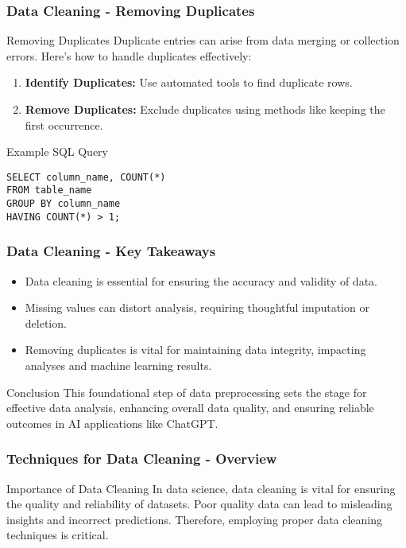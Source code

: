 \documentclass[aspectratio=169]{beamer}
\begin{document}
\begin{frame}[fragile]
    \frametitle{Data Cleaning - Removing Duplicates}
    \begin{block}{Removing Duplicates}
        Duplicate entries can arise from data merging or collection errors. Here’s how to handle duplicates effectively:
    \end{block}
    \begin{enumerate}
        \item \textbf{Identify Duplicates:} Use automated tools to find duplicate rows.
        \item \textbf{Remove Duplicates:} Exclude duplicates using methods like keeping the first occurrence.
    \end{enumerate}
    \begin{block}{Example SQL Query}
        \begin{lstlisting}
SELECT column_name, COUNT(*)
FROM table_name
GROUP BY column_name
HAVING COUNT(*) > 1;
        \end{lstlisting}
    \end{block}
\end{frame}

\begin{frame}[fragile]
    \frametitle{Data Cleaning - Key Takeaways}
    \begin{itemize}
        \item Data cleaning is essential for ensuring the accuracy and validity of data.
        \item Missing values can distort analysis, requiring thoughtful imputation or deletion.
        \item Removing duplicates is vital for maintaining data integrity, impacting analyses and machine learning results.
    \end{itemize}
    \begin{block}{Conclusion}
        This foundational step of data preprocessing sets the stage for effective data analysis, enhancing overall data quality, and ensuring reliable outcomes in AI applications like ChatGPT.
    \end{block}
\end{frame}

\begin{frame}[fragile]
    \frametitle{Techniques for Data Cleaning - Overview}
    \begin{block}{Importance of Data Cleaning}
        In data science, data cleaning is vital for ensuring the quality and reliability of datasets. 
        Poor quality data can lead to misleading insights and incorrect predictions. 
        Therefore, employing proper data cleaning techniques is critical.
    \end{block}
\end{frame}
\end{document}

